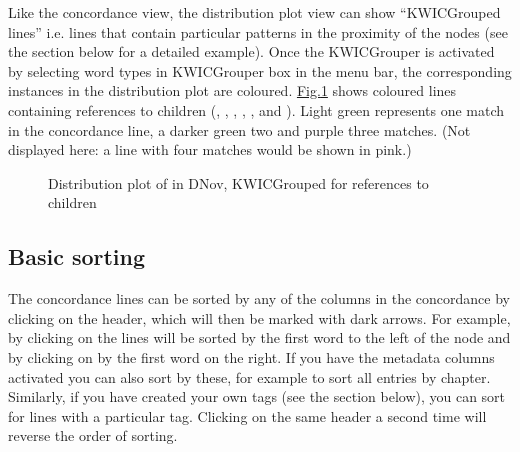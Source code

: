 \documentclass[letterpaper,10pt,english]{sphinxmanual}
\begin{document}
\sphinxAtStartPar
Like the concordance view, the distribution plot view can show
“KWICGrouped lines” i.e. lines that contain particular patterns in the
proximity of the nodes (see the {\hyperref[\detokenize{clicanalysis/subsets:kwicgrouper}]{}} section below for a
detailed example). Once the KWICGrouper is activated by selecting word
types in KWICGrouper box in the menu bar, the corresponding instances
in the distribution plot are coloured.
\hyperref[\detokenize{clicanalysis/concordance:figure-distribution-plot-workhouse-kwicgroup}]{Fig.\@ \ref{\detokenize{clicanalysis/concordance:figure-distribution-plot-workhouse-kwicgroup}}} shows coloured
lines containing references to children (, ,
, , ,  and ). Light green
represents one match in the concordance line, a darker green two and
purple three matches. (Not displayed here: a line with four matches
would be shown in pink.)

\begin{figure}[htbp]
\centering
\capstart

\noindent{}
\caption{Distribution plot of  in DNov, KWICGrouped for references to children}\label{\detokenize{clicanalysis/concordance:id13}}\label{\detokenize{clicanalysis/concordance:figure-distribution-plot-workhouse-kwicgroup}}\end{figure}


\subsection{Basic sorting}
\label{\detokenize{clicanalysis/concordance:basic-sorting}}
\sphinxAtStartPar
The concordance lines can be sorted by any of the columns in the
concordance by clicking on the header, which will then be marked with
dark arrows. For example, by clicking on  the lines will be
sorted by the first word to the left of the node and by clicking on
 by the first word on the right. If you have the metadata
columns activated you can also sort by these, for example to sort all
entries by chapter. Similarly, if you have created your own tags (see
the section {\hyperref[\detokenize{clicanalysis/subsets:manage-tag-columns}]{}} below), you can sort for lines with a
particular tag. Clicking on the same header a second time will reverse
the order of sorting.
\end{document}
